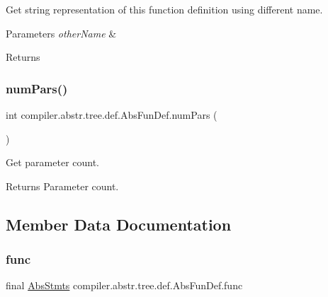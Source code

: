 Get string representation of this function definition using different name. 
\begin{DoxyParams}{Parameters}
{\em other\+Name} & \\
\hline
\end{DoxyParams}
\begin{DoxyReturn}{Returns}

\end{DoxyReturn}
\mbox{\label{classcompiler_1_1abstr_1_1tree_1_1def_1_1_abs_fun_def_aefa0345a1510770f1e25417c75fc0576}} 
\subsubsection{\texorpdfstring{num\+Pars()}{numPars()}}
{\footnotesize\ttfamily int compiler.\+abstr.\+tree.\+def.\+Abs\+Fun\+Def.\+num\+Pars (\begin{DoxyParamCaption}{ }\end{DoxyParamCaption})}

Get parameter count. \begin{DoxyReturn}{Returns}
Parameter count. 
\end{DoxyReturn}


\subsection{Member Data Documentation}
\mbox{\label{classcompiler_1_1abstr_1_1tree_1_1def_1_1_abs_fun_def_aeabcdff830e9ea48a6cd194d456559a2}} 
\subsubsection{\texorpdfstring{func}{func}}
{\footnotesize\ttfamily final \hyperlink{classcompiler_1_1abstr_1_1tree_1_1_abs_stmts}{Abs\+Stmts} compiler.\+abstr.\+tree.\+def.\+Abs\+Fun\+Def.\+func}

